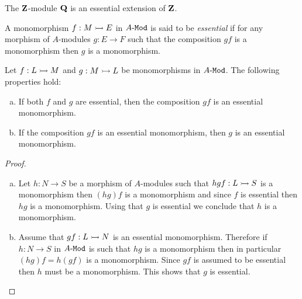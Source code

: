 \begin{example}
    \label{exp:Q-is-essential-extension-of-Z}
    The \(\mathbf{Z}\)-module \(\mathbf{Q}\) is an essential extension of \(\mathbf{Z}\).
\end{example}

\begin{definition}
    \label{def:essential-monomorphism}
    A monomorphism \(f: M \rightarrowtail E\) in \({A\text{-}\texttt{Mod}}\) is said to be \emph{essential} if
    for any morphism of \(A\)-modules \(g: E \to F\) such that the composition
    \(g f\) is a monomorphism then \(g\) is a monomorphism.
\end{definition}

\begin{lemma}
    \label{lem:essential-monomorphism-and-compositions-properties}
    Let \(f: L \rightarrowtail M\) and \(g: M \rightarrowtail L\) be monomorphisms in \({A\text{-}\texttt{Mod}}\). The
    following properties hold:
    \begin{enumerate}[(a)]\setlength\itemsep{0em}
        \item If both \(f\) and \(g\) are essential, then the composition \(g f\) is an
              essential monomorphism.

        \item If the composition \(g f\) is an essential monomorphism, then \(g\) is an
              essential monomorphism.
    \end{enumerate}
\end{lemma}

\begin{proof}
    \begin{enumerate}[(a)]\setlength\itemsep{0em}
        \item Let \(h: N \to S\) be a morphism of \(A\)-modules such that
              \(h g f: L \rightarrowtail S\) is a monomorphism then \((h g) f\) is a monomorphism and
              since \(f\) is essential then \(h g\) is a monomorphism. Using that \(g\) is
              essential we conclude that \(h\) is a monomorphism.

        \item Assume that \(g f: L \rightarrowtail N\) is an essential monomorphism. Therefore if
              \(h: N \to S\) in \({A\text{-}\texttt{Mod}}\) is such that \(h g\) is a monomorphism then in
              particular \((h g) f = h (g f)\) is a monomorphism. Since \(g f\) is assumed
              to be essential then \(h\) must be a monomorphism. This shows that \(g\) is
              essential.
    \end{enumerate}
\end{proof}


